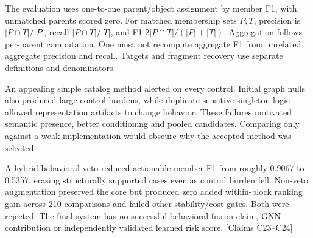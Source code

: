 \documentclass[11pt,letterpaper]{article}
\newcommand{\claims}[1]{{\small\textsf{[Claims #1]}}}
\begin{document}
The evaluation uses one-to-one parent/object assignment by member F1, with unmatched parents scored zero. For matched membership sets $P,T$, precision is $|P\cap T|/|P|$, recall $|P\cap T|/|T|$, and F1 $2|P\cap T|/(|P|+|T|)$. Aggregation follows per-parent computation. One must not recompute aggregate F1 from unrelated aggregate precision and recall. Targets and fragment recovery use separate definitions and denominators.

An appealing simple catalog method alerted on every control. Initial graph nulls also produced large control burdens, while duplicate-sensitive singleton logic allowed representation artifacts to change behavior. These failures motivated semantic presence, better conditioning and pooled candidates. Comparing only against a weak implementation would obscure why the accepted method was selected.

A hybrid behavioral veto reduced actionable member F1 from roughly 0.9067 to 0.5357, erasing structurally supported cases even as control burden fell. Non-veto augmentation preserved the core but produced zero added within-block ranking gain across 210 comparisons and failed other stability/cost gates. Both were rejected. The final system has no successful behavioral fusion claim, GNN contribution or independently validated learned risk score. \claims{C23--C24}
\end{document}

